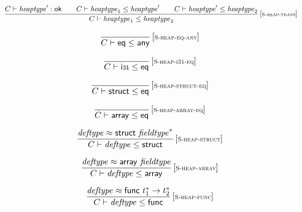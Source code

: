 $$
\begin{array}{@{}c@{}}\displaystyle
\frac{
C \vdash {\mathit{heaptype}'} : \mathsf{ok}
 \qquad
C \vdash {\mathit{heaptype}}_1 \leq {\mathit{heaptype}'}
 \qquad
C \vdash {\mathit{heaptype}'} \leq {\mathit{heaptype}}_2
}{
C \vdash {\mathit{heaptype}}_1 \leq {\mathit{heaptype}}_2
} \, {[\textsc{\scriptsize S{-}heap{-}trans}]}
\qquad
\end{array}
$$

$$
\begin{array}{@{}c@{}}\displaystyle
\frac{
}{
C \vdash \mathsf{eq} \leq \mathsf{any}
} \, {[\textsc{\scriptsize S{-}heap{-}eq{-}any}]}
\qquad
\end{array}
$$

$$
\begin{array}{@{}c@{}}\displaystyle
\frac{
}{
C \vdash \mathsf{i{\scriptstyle 31}} \leq \mathsf{eq}
} \, {[\textsc{\scriptsize S{-}heap{-}i31{-}eq}]}
\qquad
\end{array}
$$

$$
\begin{array}{@{}c@{}}\displaystyle
\frac{
}{
C \vdash \mathsf{struct} \leq \mathsf{eq}
} \, {[\textsc{\scriptsize S{-}heap{-}struct{-}eq}]}
\qquad
\end{array}
$$

$$
\begin{array}{@{}c@{}}\displaystyle
\frac{
}{
C \vdash \mathsf{array} \leq \mathsf{eq}
} \, {[\textsc{\scriptsize S{-}heap{-}array{-}eq}]}
\qquad
\end{array}
$$

$$
\begin{array}{@{}c@{}}\displaystyle
\frac{
{\mathit{deftype}} \approx \mathsf{struct}~{{\mathit{fieldtype}}^\ast}
}{
C \vdash {\mathit{deftype}} \leq \mathsf{struct}
} \, {[\textsc{\scriptsize S{-}heap{-}struct}]}
\qquad
\end{array}
$$

$$
\begin{array}{@{}c@{}}\displaystyle
\frac{
{\mathit{deftype}} \approx \mathsf{array}~{\mathit{fieldtype}}
}{
C \vdash {\mathit{deftype}} \leq \mathsf{array}
} \, {[\textsc{\scriptsize S{-}heap{-}array}]}
\qquad
\end{array}
$$

$$
\begin{array}{@{}c@{}}\displaystyle
\frac{
{\mathit{deftype}} \approx \mathsf{func}~{t_1^\ast} \rightarrow {t_2^\ast}
}{
C \vdash {\mathit{deftype}} \leq \mathsf{func}
} \, {[\textsc{\scriptsize S{-}heap{-}func}]}
\qquad
\end{array}
$$

